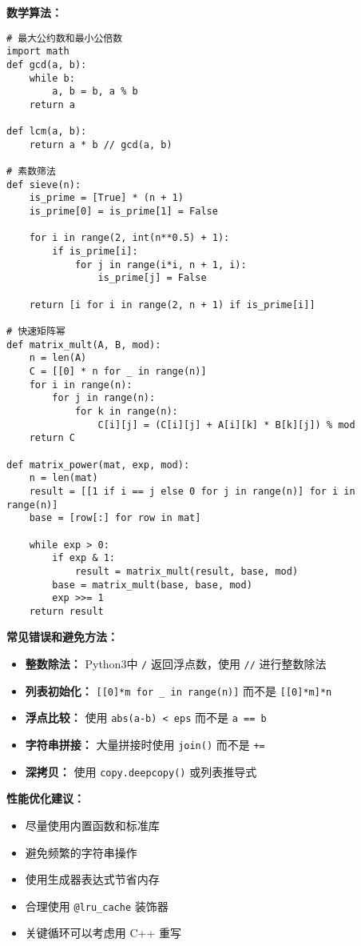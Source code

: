 \documentclass[a4paper,9pt,twocolumn]{ctexart}
\begin{document}
\textbf{数学算法：}
\begin{verbatim}
# 最大公约数和最小公倍数
import math
def gcd(a, b):
    while b:
        a, b = b, a % b
    return a

def lcm(a, b):
    return a * b // gcd(a, b)

# 素数筛法
def sieve(n):
    is_prime = [True] * (n + 1)
    is_prime[0] = is_prime[1] = False
    
    for i in range(2, int(n**0.5) + 1):
        if is_prime[i]:
            for j in range(i*i, n + 1, i):
                is_prime[j] = False
    
    return [i for i in range(2, n + 1) if is_prime[i]]

# 快速矩阵幂
def matrix_mult(A, B, mod):
    n = len(A)
    C = [[0] * n for _ in range(n)]
    for i in range(n):
        for j in range(n):
            for k in range(n):
                C[i][j] = (C[i][j] + A[i][k] * B[k][j]) % mod
    return C

def matrix_power(mat, exp, mod):
    n = len(mat)
    result = [[1 if i == j else 0 for j in range(n)] for i in range(n)]
    base = [row[:] for row in mat]
    
    while exp > 0:
        if exp & 1:
            result = matrix_mult(result, base, mod)
        base = matrix_mult(base, base, mod)
        exp >>= 1
    return result
\end{verbatim}

\textbf{常见错误和避免方法：}
\begin{itemize}
\item \textbf{整数除法：} Python3中 \texttt{/} 返回浮点数，使用 \texttt{//} 进行整数除法
\item \textbf{列表初始化：} \texttt{[[0]*m for \_ in range(n)]} 而不是 \texttt{[[0]*m]*n}
\item \textbf{浮点比较：} 使用 \texttt{abs(a-b) < eps} 而不是 \texttt{a == b}
\item \textbf{字符串拼接：} 大量拼接时使用 \texttt{join()} 而不是 \texttt{+=}
\item \textbf{深拷贝：} 使用 \texttt{copy.deepcopy()} 或列表推导式
\end{itemize}

\textbf{性能优化建议：}
\begin{itemize}
\item 尽量使用内置函数和标准库
\item 避免频繁的字符串操作
\item 使用生成器表达式节省内存
\item 合理使用 \texttt{@lru\_cache} 装饰器
\item 关键循环可以考虑用 C++ 重写
\end{itemize}
\end{document}
